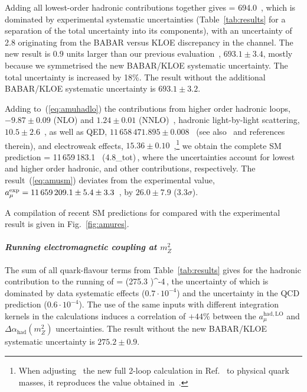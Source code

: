 Adding all lowest-order hadronic contributions together gives
\beq
\label{eq:amuhadlo}
   \amuhadLO = 694.0 \,,
\eeq
which is dominated by experimental systematic uncertainties (\cf Table~\ref{tab:results} for a separation of the total uncertainty into its components), with an uncertainty of 2.8 originating from the BABAR versus KLOE discrepancy in the \pp channel. The new result is $0.9$ units larger than  our previous evaluation~\cite{dhmz2017}, $693.1\pm3.4$, mostly because we symmetrised the new BABAR/KLOE systematic uncertainty. The total uncertainty is increased by 18\%.  The result without the additional BABAR/KLOE systematic uncertainty is $693.1\pm3.2$.

Adding to~(\ref{eq:amuhadlo}) the contributions from higher order hadronic loops, $-9.87 \pm 0.09$ (NLO) and $1.24\pm0.01$ (NNLO)~\cite{amu-hadnlo}, hadronic light-by-light scattering, $10.5\pm 2.6$~\cite{amu-lbl},  as well as QED, $11\,658\,471.895 \pm 0.008$~\cite{amu-qed} (see also~\cite{pdgg-2rev} and references therein), and electroweak effects, $15.36 \pm 0.10$~\cite{amu-ew},\footnote{When adjusting~\cite{wjm}  the new full 2-loop calculation in Ref.~\cite{amu-ew-num} to physical quark masses, it reproduces the value obtained in~\cite{amu-ew}.} we obtain the complete SM prediction
\beq
\label{eq:amusm}
  \amuSM = 11\,659\,183.1   ~(4.8_{\rm tot})\,,
\eeq
where the uncertainties account for lowest and higher order hadronic, and 
other contributions, respectively. The result~(\ref{eq:amusm}) deviates from the 
experimental value, $a_\mu^{\rm exp}=11\,659\,209.1 \pm 5.4 \pm 3.3$~\cite{bnl,pdgg-2rev}, 
by $26.0 \pm 7.9$ ($3.3\sigma$).

A compilation of recent SM predictions for \amu compared with the experimental
result is given in Fig.~\ref{fig:amures}.

\vspace{0.0cm}
\paragraph*{\bf\em Running electromagnetic coupling at \boldmath$m_Z^2$ \\[0.2cm]}

The sum of all quark-flavour terms from Table~\ref{tab:results} gives for the 
hadronic contribution to the running of \aZ
\beq
\label{eq:dahad}
   \dahadZ   = (275.3 )^{-4}\,,
\eeq
the uncertainty of which is dominated by data systematic effects ($0.7\cdot 10^{-4}$) and the uncertainty in the QCD prediction ($0.6\cdot 10^{-4}$). The use of the same inputs with different integration kernels in the calculations induces a correlation of $+44$\% between the $a_\mu^\mathrm{had, LO}$ and $\Delta \alpha_\mathrm{had}(m^2_Z)$ uncertainties. The result without the new BABAR/KLOE systematic uncertainty is $275.2\pm0.9$.

